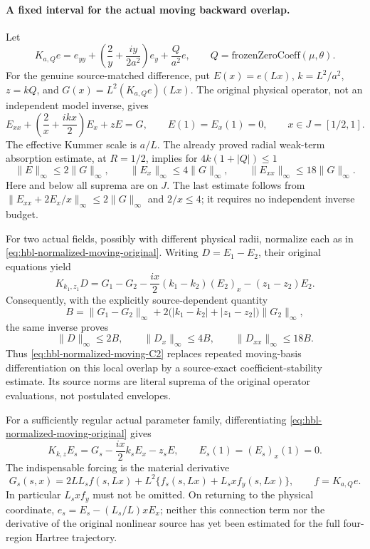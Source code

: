 \paragraph{A fixed interval for the actual moving backward overlap.}
Let
\[
 K_{a,Q}e=e_{yy}+\left(\frac2y+\frac{iy}{2a^2}\right)e_y
              +\frac{Q}{a^2}e,
 \qquad Q=\mathrm{frozenZeroCoeff}(\mu,\theta).
\]
For the genuine source-matched difference, put
\(E(x)=e(Lx)\), \(k=L^2/a^2\), \(z=kQ\), and
\(G(x)=L^2(K_{a,Q}e)(Lx)\).  The original physical
operator, not an independent model inverse, gives
\begin{equation}
 E_{xx}+\left(\frac2x+\frac{ikx}{2}\right)E_x+zE=G,
 \qquad E(1)=E_x(1)=0,
 \qquad x\in J=[1/2,1].
 \label{eq:hbl-normalized-moving-original}
\end{equation}
The effective Kummer scale is \(a/L\).  The already proved radial
weak-term absorption estimate, at \(R=1/2\), implies for
\(4k(1+|Q|)\le1\)
\[
 \|E\|_\infty\le2\|G\|_\infty,\qquad
 \|E_x\|_\infty\le4\|G\|_\infty,\qquad
 \|E_{xx}\|_\infty\le18\|G\|_\infty.
\]
Here and below all suprema are on \(J\).  The last estimate follows
from \(\|E_{xx}+2E_x/x\|_\infty\le2\|G\|_\infty\) and
\(2/x\le4\); it requires no independent inverse budget.

For two actual fields, possibly with different physical radii,
normalize each as in \eqref{eq:hbl-normalized-moving-original}.
Writing \(D=E_1-E_2\), their original equations yield
\[
 K_{k_1,z_1}D
 =G_1-G_2-\frac{ix}{2}(k_1-k_2)(E_2)_x-(z_1-z_2)E_2.
\]
Consequently, with the explicitly source-dependent quantity
\[
 B=\|G_1-G_2\|_\infty+
       2\bigl(|k_1-k_2|+|z_1-z_2|\bigr)\|G_2\|_\infty,
\]
the same inverse proves
\begin{equation}
 \|D\|_\infty\le2B,\qquad
 \|D_x\|_\infty\le4B,\qquad
 \|D_{xx}\|_\infty\le18B.
 \label{eq:hbl-normalized-moving-C2}
\end{equation}
Thus \eqref{eq:hbl-normalized-moving-C2} replaces repeated
moving-basis differentiation on this local overlap by a source-exact
coefficient-stability estimate.  Its source norms are literal suprema
of the original operator evaluations, not postulated envelopes.

For a sufficiently regular actual parameter family, differentiating
\eqref{eq:hbl-normalized-moving-original} gives
\[
 K_{k,z}E_s=G_s-\frac{ix}{2}k_sE_x-z_sE,
 \qquad E_s(1)=(E_s)_x(1)=0.
\]
The indispensable forcing is the material derivative
\[
 G_s(s,x)=2LL_sf(s,Lx)+L^2\{f_s(s,Lx)+L_sxf_y(s,Lx)\},
 \qquad f=K_{a,Q}e.
\]
In particular \(L_sxf_y\) must not be omitted.  On returning to the
physical coordinate, \(e_s=E_s-(L_s/L)xE_x\); neither this connection
term nor the derivative of the original nonlinear source has yet been
estimated for the full four-region Hartree trajectory.

